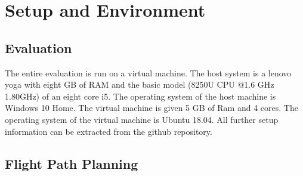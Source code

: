 \section{Setup and Environment}

	\subsection{Evaluation}
	
	The entire evaluation is run on a virtual machine. The host system is a lenovo yoga with eight GB of RAM and the basic model (8250U CPU @1.6 
	GHz 1.80GHz) of an eight core i5. The operating system of the host machine is Windows 10 Home. The virtual
	machine is given 5 GB of Ram and 4 cores. The operating system of the virtual machine is Ubuntu 18.04. All further setup information can be extracted 
	from the github repository.

	\subsection{Flight Path Planning}
 
 